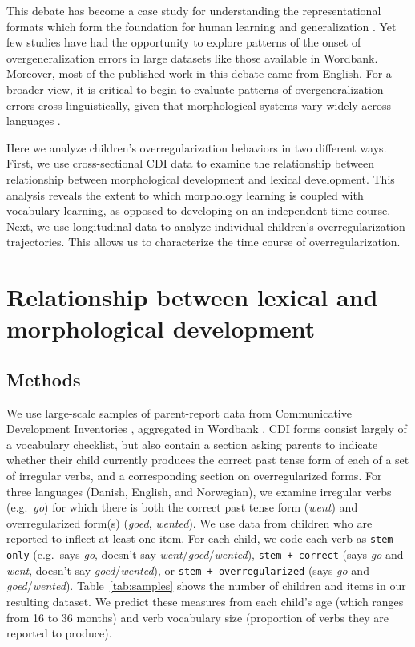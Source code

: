 \documentclass[
   11pt,
       ]{book}
\begin{document}
This debate has become a case study for understanding the representational formats which form the foundation for human learning and generalization \citep{pinker1998}. Yet few studies have had the opportunity to explore patterns of the onset of overgeneralization errors in large datasets like those available in Wordbank. Moreover, most of the published work in this debate came from English. For a broader view, it is critical to begin to evaluate patterns of overgeneralization errors cross-linguistically, given that morphological systems vary widely across languages \citep{marcus1995cog, clahsen1992}.

Here we analyze children's overregularization behaviors in two different ways. First, we use cross-sectional CDI data to examine the relationship between relationship between morphological development and lexical development. This analysis reveals the extent to which morphology learning is coupled with vocabulary learning, as opposed to developing on an independent time course. Next, we use longitudinal data to analyze individual children's overregularization trajectories. This allows us to characterize the time course of overregularization.

\hypertarget{relationship-between-lexical-and-morphological-development}{%
\section{Relationship between lexical and morphological development}\label{relationship-between-lexical-and-morphological-development}}

\hypertarget{methods-1}{%
\subsection{Methods}\label{methods-1}}

We use large-scale samples of parent-report data from Communicative Development Inventories \citep{fenson2007}, aggregated in Wordbank \citep{frank2017}. CDI forms consist largely of a vocabulary checklist, but also contain a section asking parents to indicate whether their child currently produces the correct past tense form of each of a set of irregular verbs, and a corresponding section on overregularized forms. For three languages (Danish, English, and Norwegian), we examine irregular verbs (e.g.~\emph{go}) for which there is both the correct past tense form (\emph{went}) and overregularized form(s) (\emph{goed}, \emph{wented}). We use data from children who are reported to inflect at least one item. For each child, we code each verb as \texttt{stem-only} (e.g.~says \emph{go}, doesn't say \emph{went}/\emph{goed}/\emph{wented}), \texttt{stem\ +\ correct} (says \emph{go} and \emph{went}, doesn't say \emph{goed}/\emph{wented}), or \texttt{stem\ +\ overregularized} (says \emph{go} and \emph{goed}/\emph{wented}). Table~\ref{tab:samples} shows the number of children and items in our resulting dataset. We predict these measures from each child's age (which ranges from 16 to 36 months) and verb vocabulary size (proportion of verbs they are reported to produce).
\end{document}
